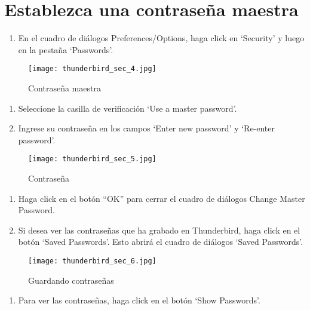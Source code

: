 \documentclass[10pt,a5paper,twoside,,]{book}
\providecommand{\tightlist}{%
  \setlength{\itemsep}{0pt}\setlength{\parskip}{0pt}}
\begin{document}
\section{Establezca una contraseña
maestra}\label{establezca-una-contraseuxf1a-maestra}

\begin{enumerate}
\def\labelenumi{\arabic{enumi}.}
\tightlist
\item
  En el cuadro de diálogos Preferences/Options, haga click en `Security'
  y luego en la pestaña `Passwords'.
\end{enumerate}

\begin{figure}[htbp]
\centering
\texttt{[image: thunderbird\_sec\_4.jpg]}
\caption{Contraseña maestra}
\end{figure}

\begin{enumerate}
\def\labelenumi{\arabic{enumi}.}
\setcounter{enumi}{1}
\tightlist
\item
  Seleccione la casilla de verificación `Use a master password'.
\item
  Ingrese su contraseña en los campos `Enter new password' y `Re-enter
  password'.
\end{enumerate}

\begin{figure}[htbp]
\centering
\texttt{[image: thunderbird\_sec\_5.jpg]}
\caption{Contraseña}
\end{figure}

\begin{enumerate}
\def\labelenumi{\arabic{enumi}.}
\setcounter{enumi}{3}
\tightlist
\item
  Haga click en el botón ``OK'' para cerrar el cuadro de diálogos Change
  Master Password.
\item
  Si desea ver las contraseñas que ha grabado en Thunderbird, haga click
  en el botón `Saved Passwords'. Esto abrirá el cuadro de diálogos
  `Saved Passwords'.
\end{enumerate}

\begin{figure}[htbp]
\centering
\texttt{[image: thunderbird\_sec\_6.jpg]}
\caption{Guardando contraseñas}
\end{figure}

\begin{enumerate}
\def\labelenumi{\arabic{enumi}.}
\setcounter{enumi}{5}
\tightlist
\item
  Para ver las contraseñas, haga click en el botón `Show Passwords'.
\end{enumerate}
\end{document}
